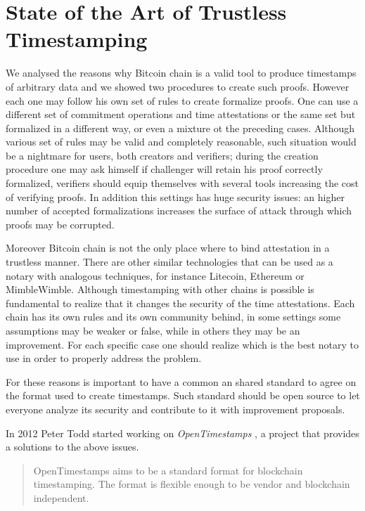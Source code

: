 \chapter{State of the Art of Trustless Timestamping}
\label{chpr:state-of-art}
We analysed the reasons why Bitcoin chain is a valid tool to produce timestamps of arbitrary data and we showed two procedures to create such proofs.
However each one may follow his own set of rules to create formalize proofs. 
One can use a different set of commitment operations and time attestations or the same set but formalized in a different way, or even a mixture ot the preceding cases. 
Although various set of rules may be valid and completely reasonable, such situation would be a nightmare for users, both creators and verifiers; during the creation procedure one may ask himself if challenger will retain his proof correctly formalized, verifiers should equip themselves with several tools increasing the cost of verifying proofs.
In addition this settings has huge security issues: an higher number of accepted formalizations increases the surface of attack through which proofs may be corrupted. 

Moreover Bitcoin chain is not the only place where to bind attestation in a trustless manner. 
There are other similar technologies that can be used as a notary with analogous techniques, for instance Litecoin, Ethereum or MimbleWimble.
Although timestamping with other chains is possible is fundamental to realize that it changes the security of the time attestations.
Each chain has its own rules and its own community behind, in some settings some assumptions may be weaker or false, while in others they may be an improvement.
For each specific case one should realize which is the best notary to use in order to properly address the problem.

For these reasons is important to have a common an shared standard to agree on the format used to create timestamps. 
Such standard should be open source to let everyone analyze its security and contribute to it with improvement proposals.

In 2012 Peter Todd started working on \textit{OpenTimestamps} \cite{OTSWeb} \cite{OpenTimestampsGithub} \cite{OTSannouncment}, a project that provides a solutions to the above issues.

\begin{quotation}
	OpenTimestamps aims to be a standard format for blockchain timestamping. The format is flexible enough to be vendor and blockchain independent.
\end{quotation}


